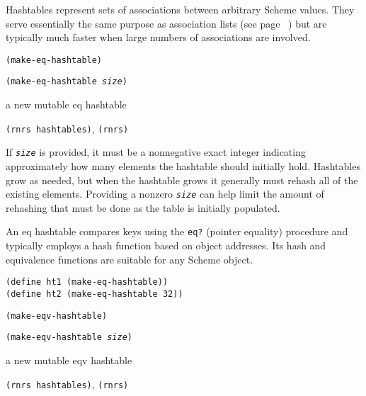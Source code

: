 \label{objects_s272}\label{objects_s273}Hashtables represent sets of associations between
arbitrary Scheme values.
They serve essentially the same purpose as association lists (see page
 \pageref{objects_page_assq}) but are typically much faster when large numbers
of associations are involved.

\begin{description}

\label{objects_s274}\item[procedure] \texttt{(make-eq-hashtable)}



\item[procedure] \texttt{(make-eq-hashtable \textit{size})}



\item[returns] a new mutable eq hashtable


\item[libraries] \texttt{(rnrs hashtables)}, \texttt{(rnrs)}
\end{description}


If \texttt{\textit{size}} is provided, it must be a nonnegative exact integer
indicating approximately how many elements the hashtable should
initially hold.
Hashtables grow as needed, but when the hashtable grows it generally must
rehash all of the existing elements.
Providing a nonzero \texttt{\textit{size}} can help limit the amount of rehashing
that must be done as the table is initially populated.


An eq hashtable compares keys using the \texttt{eq?} (pointer equality)
procedure and typically employs a hash function based on object addresses.
Its hash and equivalence functions are suitable for any Scheme object.


\begin{alltt}
(define ht1 (make-eq-hashtable))
(define ht2 (make-eq-hashtable 32))
\end{alltt}

\begin{description}

\label{objects_s275}\item[procedure] \texttt{(make-eqv-hashtable)}



\item[procedure] \texttt{(make-eqv-hashtable \textit{size})}



\item[returns] a new mutable eqv hashtable


\item[libraries] \texttt{(rnrs hashtables)}, \texttt{(rnrs)}
\end{description}


